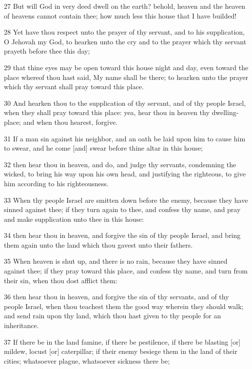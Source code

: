 \par 27 But will God in very deed dwell on the earth? behold, heaven and the heaven of heavens cannot contain thee; how much less this house that I have builded!
\par 28 Yet have thou respect unto the prayer of thy servant, and to his supplication, O Jehovah my God, to hearken unto the cry and to the prayer which thy servant prayeth before thee this day;
\par 29 that thine eyes may be open toward this house night and day, even toward the place whereof thou hast said, My name shall be there; to hearken unto the prayer which thy servant shall pray toward this place.
\par 30 And hearken thou to the supplication of thy servant, and of thy people Israel, when they shall pray toward this place: yea, hear thou in heaven thy dwelling-place; and when thou hearest, forgive.
\par 31 If a man sin against his neighbor, and an oath be laid upon him to cause him to swear, and he come [and] swear before thine altar in this house;
\par 32 then hear thou in heaven, and do, and judge thy servants, condemning the wicked, to bring his way upon his own head, and justifying the righteous, to give him according to his righteousness.
\par 33 When thy people Israel are smitten down before the enemy, because they have sinned against thee; if they turn again to thee, and confess thy name, and pray and make supplication unto thee in this house:
\par 34 then hear thou in heaven, and forgive the sin of thy people Israel, and bring them again unto the land which thou gavest unto their fathers.
\par 35 When heaven is shut up, and there is no rain, because they have sinned against thee; if they pray toward this place, and confess thy name, and turn from their sin, when thou dost afflict them:
\par 36 then hear thou in heaven, and forgive the sin of thy servants, and of thy people Israel, when thou teachest them the good way wherein they should walk; and send rain upon thy land, which thou hast given to thy people for an inheritance.
\par 37 If there be in the land famine, if there be pestilence, if there be blasting [or] mildew, locust [or] caterpillar; if their enemy besiege them in the land of their cities; whatsoever plague, whatsoever sickness there be;

